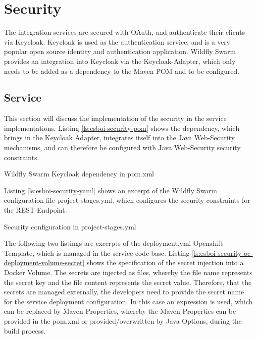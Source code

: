 \section{Security}
\label{sec:esbi-security}
The integration services are secured with OAuth, and authenticate their clients via Keycloak. Keycloak is used as the authentication service, and is a very popular open source identity and authentication application. Wildfly Swarm provides an integration into Keycloak via the Keycloak-Adapter, which only needs to be added as a dependency to the Maven POM and to be configured.

\subsection{Service}
\label{sec:esbi-security-service}
This section will discuss the implementation of the security in the service implementations. Listing \vref{ls:esboi-security-pom} shows the dependency, which brings in the Keycloak Adapter, integrates itself into the Java Web-Security mechanisms, and can therefore be configured with Java Web-Security security constraints.
\begin{listing}
	\caption{Wildfly Swarm Keycloak dependency in pom.xml}
	\label{ls:esboi-security-pom}
\end{listing}

Listing \vref{ls:esboi-security-yaml} shows an excerpt of the Wildfly Swarm configuration file project-stages.yml, which configures the security constraints for the REST-Endpoint.

\begin{listing}
	\caption{Security configuration in project-stages.yml}
	\label{ls:esboi-security-yaml}
\end{listing}

The following two listings are excerpts of the deployment.yml Openshift Template, which is managed in the service code base. Listing \vref{ls:esboi-security-oc-deployment-volume-secret} shows the specification of the secret injection into a Docker Volume. The secrets are injected as files, whereby the file name represents the secret key and the file content represents the secret value. Therefore, that the secrets are managed externally, the developers need to provide the secret name for the service deployment configuration. In this case an expression is used, which can be replaced by Maven Properties, whereby the Maven Properties can be provided in the pom.xml or provided/overwritten by Java Options, during the build process.


